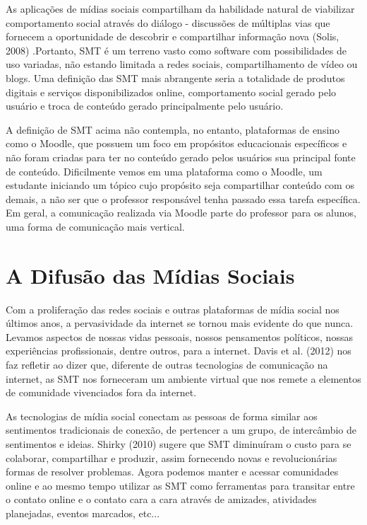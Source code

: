 As aplicações de mídias sociais compartilham da habilidade natural de viabilizar
comportamento social através do diálogo - discussões de múltiplas vias que
fornecem a oportunidade de descobrir e compartilhar informação nova (Solis, 2008)
.Portanto, SMT é um terreno vasto como software com
possibilidades de uso variadas, não estando limitada a redes sociais,
compartilhamento de vídeo ou blogs. Uma definição das SMT mais abrangente seria
a totalidade de produtos digitais e serviços disponibilizados online,
comportamento social gerado pelo usuário e troca de conteúdo gerado principalmente
pelo usuário.

A definição de SMT acima não contempla, no entanto, plataformas de ensino como o
Moodle, que possuem um foco em propósitos educacionais específicos e não foram
criadas para ter no conteúdo gerado pelos usuários sua principal fonte de
conteúdo. Dificilmente vemos em uma plataforma como o Moodle, um estudante
iniciando um tópico cujo propósito seja compartilhar conteúdo com os demais, a
não ser que o professor responsável tenha passado essa tarefa específica. Em
geral, a comunicação realizada via Moodle parte do professor para os alunos, uma
forma de comunicação mais vertical.

\section{A Difusão das Mídias Sociais}

Com a proliferação das redes sociais e outras plataformas de mídia social nos
últimos anos, a pervasividade da internet se tornou mais evidente do que nunca.
Levamos aspectos de nossas vidas pessoais, nossos pensamentos políticos, nossas
experiências profissionais, dentre outros, para a internet. Davis et al. (2012)
nos faz refletir ao dizer que, diferente de outras tecnologias
de comunicação na internet, as SMT nos forneceram um ambiente virtual que nos
remete a elementos de comunidade vivenciados fora da internet.

As tecnologias de mídia social conectam as pessoas de forma similar aos sentimentos
tradicionais de conexão, de pertencer a um grupo, de intercâmbio de sentimentos
e ideias. Shirky (2010)
 sugere que SMT diminuíram o custo para
se colaborar, compartilhar e produzir, assim fornecendo novas e revolucionárias
formas de resolver problemas. Agora podemos manter e acessar comunidades online
e ao mesmo tempo utilizar as SMT como ferramentas para transitar entre o contato
online e o contato cara a cara através de amizades, atividades planejadas,
eventos marcados, etc...


